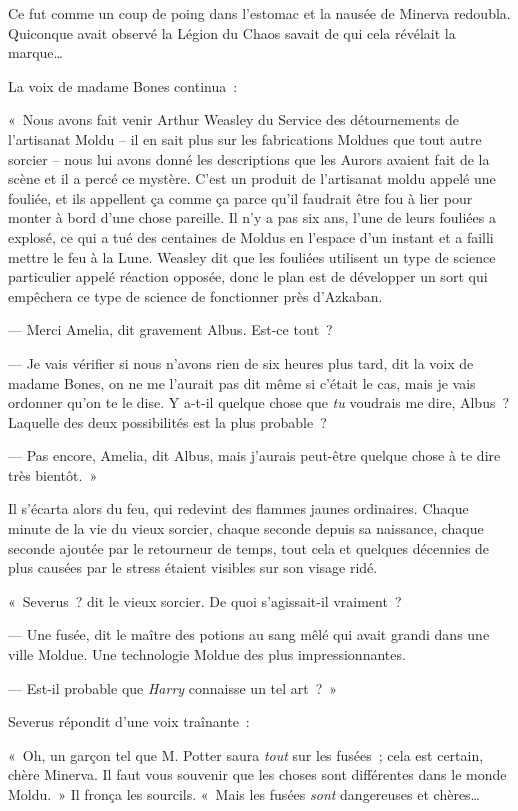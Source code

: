 Ce fut comme un coup de poing dans l'estomac et la nausée de Minerva redoubla.
Quiconque avait observé la Légion du Chaos savait de qui cela révélait la marque…

La voix de madame Bones continua~:

«~Nous avons fait venir Arthur Weasley du Service des détournements de l'artisanat Moldu -- il en sait plus sur les fabrications Moldues que tout autre sorcier -- nous lui avons donné les descriptions que les Aurors avaient fait de la scène et il a percé ce mystère.
C'est un produit de l'artisanat moldu appelé une fouliée, et ils appellent ça comme ça parce qu'il faudrait être fou à lier pour monter à bord d'une chose pareille.
Il n'y a pas six ans, l'une de leurs fouliées a explosé, ce qui a tué des centaines de Moldus en l'espace d'un instant et a failli mettre le feu à la Lune.
Weasley dit que les fouliées utilisent un type de science particulier appelé réaction opposée, donc le plan est de développer un sort qui empêchera ce type de science de fonctionner près d'Azkaban.

--- Merci Amelia, dit gravement Albus.
Est-ce tout~?

--- Je vais vérifier si nous n'avons rien de six heures plus tard, dit la voix de madame Bones, on ne me l'aurait pas dit même si c'était le cas, mais je vais ordonner qu'on te le dise.
Y a-t-il quelque chose que \emph{tu} voudrais me dire, Albus~?
Laquelle des deux possibilités est la plus probable~?

--- Pas encore, Amelia, dit Albus, mais j'aurais peut-être quelque chose à te dire très bientôt.~»

Il s'écarta alors du feu, qui redevint des flammes jaunes ordinaires.
Chaque minute de la vie du vieux sorcier, chaque seconde depuis sa naissance, chaque seconde ajoutée par le retourneur de temps, tout cela et quelques décennies de plus causées par le stress étaient visibles sur son visage ridé.

«~Severus~? dit le vieux sorcier.
De quoi s'agissait-il vraiment~?

--- Une fusée, dit le maître des potions au sang mêlé qui avait grandi dans une ville Moldue.
Une technologie Moldue des plus impressionnantes.

--- Est-il probable que \emph{Harry} connaisse un tel art~?~»

Severus répondit d'une voix traînante~:

«~Oh, un garçon tel que M. Potter saura \emph{tout} sur les fusées~; cela est certain, chère Minerva.
Il faut vous souvenir que les choses sont différentes dans le monde Moldu.~»
Il fronça les sourcils.
«~Mais les fusées \emph{sont} dangereuses et chères…

